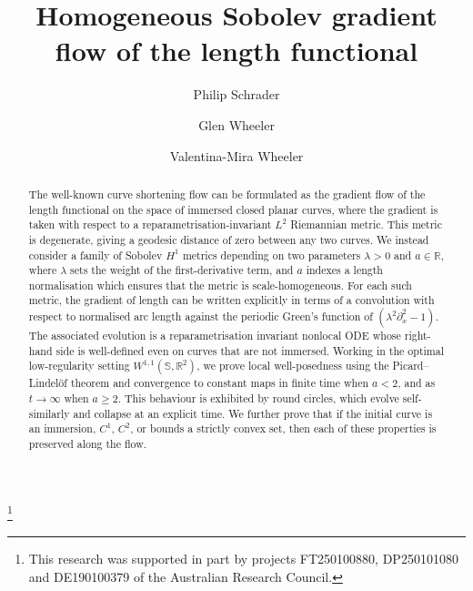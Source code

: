 \documentclass[a4paper,11pt]{amsart}
\theoremstyle{definition}\newtheorem*{definition}{Definition}
\theoremstyle{definition} \newtheorem{proposition}[theorem]{Proposition}
\theoremstyle{definition}\newtheorem{lemma}[theorem]{Lemma}
\theoremstyle{definition}\newtheorem{corollary}[theorem]{Corollary}
\theoremstyle{definition}\newtheorem{example}{Example}
\theoremstyle{remark}\newtheorem*{remark}{Remark}
\def\R{\mathbb{R}}
\def\S{\mathbb{S}}
\begin{document}
\title{Homogeneous Sobolev gradient flow of the length functional}


\author[P. Schrader]{Philip Schrader}
\address{School of Mathematics and Statistics, Chemistry and Physics\\ Murdoch University\\
South Street, Murdoch, WA $6150$\\ Australia}

\author[G. Wheeler]{Glen Wheeler}
\address{Institute for Mathematics and its Applications, School of Mathematics and Applied Statistics\\
University of Wollongong\\
Northfields Ave, Wollongong, NSW $2500$\\
Australia}

\author[V.-M. Wheeler]{Valentina-Mira Wheeler}
\address{Institute for Mathematics and its Applications, School of Mathematics and Applied Statistics\\
University of Wollongong\\
Northfields Ave, Wollongong, NSW $2500$\\
Australia}

\thanks{
This research was supported in part by
projects FT250100880, DP250101080 and DE190100379 of the Australian Research
Council.}


\begin{abstract}
The well-known curve shortening flow can be formulated as the gradient flow of the length functional on the space of immersed closed planar curves, where the gradient is taken with respect to a reparametrisation-invariant $L^2$ Riemannian metric. This metric is degenerate, giving a geodesic distance of zero between any two curves. We instead consider a family of Sobolev $H^1$ metrics depending on two parameters $\lambda>0$ and $a\in \R$, where $\lambda$ sets the weight of the first-derivative term, and $a$ indexes a length normalisation which ensures that the metric is scale-homogeneous. For each such metric, the gradient of length can be written explicitly in terms of a convolution with respect to normalised arc length against the periodic Green's function of $(\lambda^2 \partial_x^2-1)$. The associated evolution is a reparametrisation invariant nonlocal ODE whose right-hand side is well-defined even on curves that are not immersed. Working in the optimal low-regularity setting $W^{1,1}(\S,\R^2)$, we prove local well-posedness using the Picard--Lindel\"of theorem and convergence to constant maps in finite time when $a<2$, and as $t\to\infty$ when $a\geq 2$. This behaviour is exhibited by round circles, which evolve self-similarly and collapse at an explicit time. We further prove that if the initial curve is an immersion, $C^1$, $C^2$, or bounds a strictly convex set, then each of these properties is preserved along the flow. 

\end{abstract}
\end{document}
